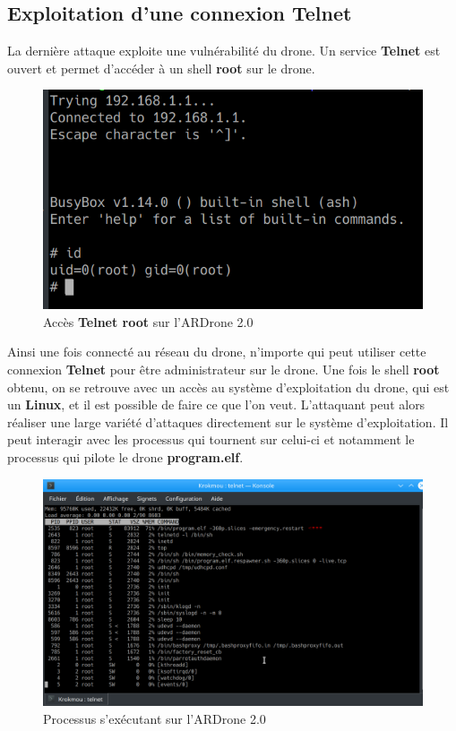 \subsection{Exploitation d'une connexion Telnet}
La dernière attaque exploite une vulnérabilité du drone. Un service \textbf{Telnet} est ouvert et permet d'accéder à un shell \textbf{root} sur le drone.

\begin{figure}[H]
  \centering
  \includegraphics[scale=0.7]{images/root.png}
  \caption{Accès \textbf{Telnet root} sur l'ARDrone 2.0}
\end{figure}

Ainsi une fois connecté au réseau du drone, n'importe qui peut utiliser cette connexion \textbf{Telnet} pour être administrateur sur le drone. Une fois le shell \textbf{root} obtenu, on se retrouve avec un accès au système d'exploitation du drone, qui est un \textbf{Linux}, et il est possible de faire ce que l'on veut. L'attaquant peut alors réaliser une large variété d'attaques directement sur le système d'exploitation. Il peut interagir avec les processus qui tournent sur celui-ci et notamment le processus qui pilote le drone \textbf{program.elf}.

\begin{figure}[H]
  \centering
  \includegraphics[scale=0.35]{images/processus.png}
  \caption{Processus s'exécutant sur l'ARDrone 2.0}
\end{figure}

